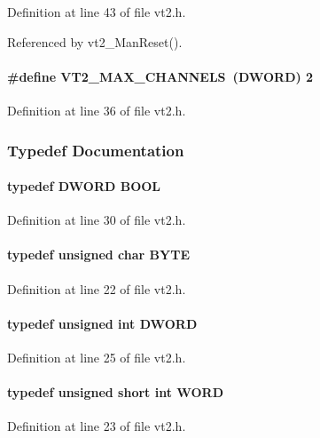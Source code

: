 Definition at line 43 of file vt2.h.

Referenced by vt2\_\-ManReset().
\paragraph[{VT2\_\-MAX\_\-CHANNELS}]{\setlength{\rightskip}{0pt plus 5cm}\#define VT2\_\-MAX\_\-CHANNELS~({\bf DWORD}) 2}\hfill\label{vt2_8h_a9491e99a71f8a252f115c94fd627e398}


Definition at line 36 of file vt2.h.

\subsubsection{Typedef Documentation}
\paragraph[{BOOL}]{\setlength{\rightskip}{0pt plus 5cm}typedef {\bf DWORD} {\bf BOOL}}\hfill\label{vt2_8h_a239c7f0d40651c3e419c5b9651507d14}


Definition at line 30 of file vt2.h.
\paragraph[{BYTE}]{\setlength{\rightskip}{0pt plus 5cm}typedef unsigned char {\bf BYTE}}\hfill\label{vt2_8h_a4ae1dab0fb4b072a66584546209e7d58}


Definition at line 22 of file vt2.h.
\paragraph[{DWORD}]{\setlength{\rightskip}{0pt plus 5cm}typedef unsigned int {\bf DWORD}}\hfill\label{vt2_8h_a798af1e30bc65f319c1a246cecf59e39}


Definition at line 25 of file vt2.h.
\paragraph[{WORD}]{\setlength{\rightskip}{0pt plus 5cm}typedef unsigned short int {\bf WORD}}\hfill\label{vt2_8h_a2b0e863dadf920709ec53d9088ee7c91}


Definition at line 23 of file vt2.h.